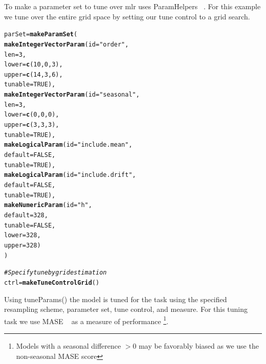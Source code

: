 \documentclass{article}\usepackage[]{graphicx}\usepackage[]{color}
\makeatletter
\newcommand{\hlnum}[1]{\textcolor[rgb]{0.686,0.059,0.569}{#1}}%
\newcommand{\hlstr}[1]{\textcolor[rgb]{0.192,0.494,0.8}{#1}}%
\newcommand{\hlcom}[1]{\textcolor[rgb]{0.678,0.584,0.686}{\textit{#1}}}%
\newcommand{\hlstd}[1]{\textcolor[rgb]{0.345,0.345,0.345}{#1}}%
\newcommand{\hlkwb}[1]{\textcolor[rgb]{0.69,0.353,0.396}{#1}}%
\newcommand{\hlkwc}[1]{\textcolor[rgb]{0.333,0.667,0.333}{#1}}%
\newcommand{\hlkwd}[1]{\textcolor[rgb]{0.737,0.353,0.396}{\textbf{#1}}}%
\newenvironment{kframe}{%
 \def\at@end@of@kframe{}%
 \ifinner\ifhmode%
  \def\at@end@of@kframe{\end{minipage}}%
  \begin{minipage}{\columnwidth}%
 \fi\fi%
 \def\FrameCommand##1{\hskip\@totalleftmargin \hskip-\fboxsep
 \colorbox{shadecolor}{##1}\hskip-\fboxsep
     \hskip-\linewidth \hskip-\@totalleftmargin \hskip\columnwidth}%
 \MakeFramed {\advance\hsize-\width
   \@totalleftmargin\z@ \linewidth\hsize
   \@setminipage}}%
 {\par\unskip\endMakeFramed%
 \at@end@of@kframe}
\newenvironment{knitrout}{}{} %
\theoremstyle{definition}
\newcommand\code{\@codex}
\def\@codex#1{{\normalfont\ttfamily\hyphenchar\font=-1 #1}}
\newcommand{\pkg}[1]{{\fontseries{b}\selectfont #1}}
\makeatother
\begin{document}
To make a parameter set to tune over \pkg{mlr} uses \pkg{ParamHelpers} ~\cite{paramhelper}. For this example we tune over the entire grid space by setting our tune control to a grid search. 
\begin{knitrout}
\color{fgcolor}\begin{kframe}
\begin{alltt}
\hlstd{parSet} \hlkwb{=} \hlkwd{makeParamSet}\hlstd{(}
  \hlkwd{makeIntegerVectorParam}\hlstd{(}\hlkwc{id} \hlstd{=} \hlstr{"order"}\hlstd{,}
                         \hlkwc{len} \hlstd{=} \hlnum{3}\hlstd{,}
                         \hlkwc{lower} \hlstd{=} \hlkwd{c}\hlstd{(}\hlnum{10}\hlstd{,}\hlnum{0}\hlstd{,}\hlnum{3}\hlstd{),}
                         \hlkwc{upper} \hlstd{=} \hlkwd{c}\hlstd{(}\hlnum{14}\hlstd{,}\hlnum{3}\hlstd{,}\hlnum{6}\hlstd{),}
                         \hlkwc{tunable} \hlstd{=} \hlnum{TRUE}\hlstd{),}
  \hlkwd{makeIntegerVectorParam}\hlstd{(}\hlkwc{id} \hlstd{=} \hlstr{"seasonal"}\hlstd{,}
                         \hlkwc{len} \hlstd{=} \hlnum{3}\hlstd{,}
                         \hlkwc{lower} \hlstd{=} \hlkwd{c}\hlstd{(}\hlnum{0}\hlstd{,}\hlnum{0}\hlstd{,}\hlnum{0}\hlstd{),}
                         \hlkwc{upper} \hlstd{=} \hlkwd{c}\hlstd{(}\hlnum{3}\hlstd{,}\hlnum{3}\hlstd{,}\hlnum{3}\hlstd{),}
                         \hlkwc{tunable} \hlstd{=} \hlnum{TRUE}\hlstd{),}
  \hlkwd{makeLogicalParam}\hlstd{(}\hlkwc{id} \hlstd{=} \hlstr{"include.mean"}\hlstd{,}
                   \hlkwc{default} \hlstd{=} \hlnum{FALSE}\hlstd{,}
                   \hlkwc{tunable} \hlstd{=} \hlnum{TRUE}\hlstd{),}
  \hlkwd{makeLogicalParam}\hlstd{(}\hlkwc{id} \hlstd{=} \hlstr{"include.drift"}\hlstd{,}
                   \hlkwc{default} \hlstd{=} \hlnum{FALSE}\hlstd{,}
                   \hlkwc{tunable} \hlstd{=} \hlnum{TRUE}\hlstd{),}
  \hlkwd{makeNumericParam}\hlstd{(}\hlkwc{id} \hlstd{=} \hlstr{"h"}\hlstd{,}
                   \hlkwc{default} \hlstd{=} \hlnum{328}\hlstd{,}
                   \hlkwc{tunable} \hlstd{=} \hlnum{FALSE}\hlstd{,}
                   \hlkwc{lower} \hlstd{=} \hlnum{328}\hlstd{,}
                   \hlkwc{upper} \hlstd{=} \hlnum{328}\hlstd{)}
\hlstd{)}

\hlcom{#Specify tune by grid estimation}
\hlstd{ctrl} \hlkwb{=} \hlkwd{makeTuneControlGrid}\hlstd{()}
\end{alltt}
\end{kframe}
\end{knitrout}

Using \code{tuneParams()} the model is tuned for the task using the specified resampling scheme, parameter set, tune control, and measure. For this tuning task we use MASE ~\cite{Hyndman2006} as a measure of performance \footnote{Models with a seasonal difference $> 0$ may be favorably biased as we use the non-seasonal MASE score}.
\end{document}
